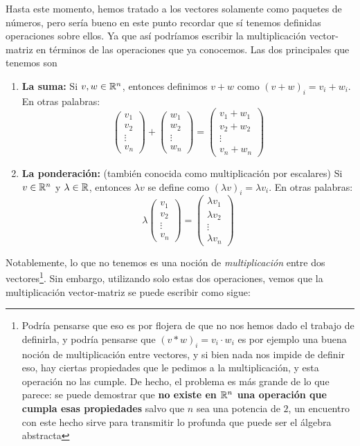 Hasta este momento, hemos tratado a los vectores solamente como paquetes de números, pero sería bueno en este punto recordar que sí tenemos definidas operaciones sobre ellos. Ya que así podríamos escribir la multiplicación vector-matriz en términos de las operaciones que ya conocemos. Las dos principales que tenemos son
\begin{enumerate}
    \item \textbf{La suma:} Si $v, w \in \mathbb{R}^n$, entonces definimos $v + w$ como $(v + w)_i = v_i + w_i$. En otras palabras:
    \[\begin{pmatrix}
        v_1 \\ v_2 \\ \vdots \\ v_n
    \end{pmatrix} + \begin{pmatrix}
        w_1 \\ w_2 \\ \vdots \\ w_n
    \end{pmatrix} = \begin{pmatrix}
        v_1 + w_1 \\ v_2 + w_2 \\ \vdots \\ v_n + w_n
    \end{pmatrix}\]
    \item \textbf{La ponderación:} (también conocida como multiplicación por escalares) Si $v \in \mathbb{R}^n$ y $\lambda \in \mathbb{R}$, entonces $\lambda v$ se define como $(\lambda v)_i = \lambda v_i$. En otras palabras:
    \[\lambda \begin{pmatrix}
        v_1 \\ v_2 \\ \vdots \\ v_n
    \end{pmatrix} = \begin{pmatrix}
        \lambda v_1 \\ \lambda v_2 \\ \vdots \\ \lambda v_n
    \end{pmatrix}\]
\end{enumerate}

Notablemente, lo que no tenemos es una noción de \textit{multiplicación} entre dos vectores\footnote{Podría pensarse que eso es por flojera de que no nos hemos dado el trabajo de definirla, y podría pensarse que $(v * w)_i = v_i \cdot w_i$ es por ejemplo una buena noción de multiplicación entre vectores, y si bien nada nos impide de definir eso, hay ciertas propiedades que le pedimos a la multiplicación, y esta operación no las cumple. De hecho, el problema es más grande de lo que parece: se puede demostrar que \textbf{no existe en $\mathbb{R}^n$ una operación que cumpla esas propiedades} salvo que $n$ sea una potencia de $2$, un encuentro con este hecho sirve para transmitir lo profunda que puede ser el álgebra abstracta}. Sin embargo, utilizando solo estas dos operaciones, vemos que la multiplicación vector-matriz se puede escribir como sigue:

